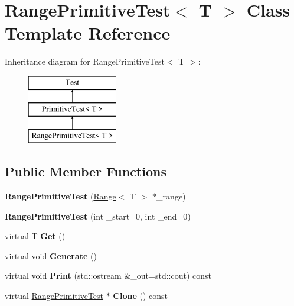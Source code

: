 \hypertarget{class_range_primitive_test}{}\section{Range\+Primitive\+Test$<$ T $>$ Class Template Reference}
\label{class_range_primitive_test}
Inheritance diagram for Range\+Primitive\+Test$<$ T $>$\+:\begin{figure}[H]
\begin{center}
\leavevmode
\includegraphics[height=3.000000cm]{class_range_primitive_test}
\end{center}
\end{figure}
\subsection*{Public Member Functions}
\begin{DoxyCompactItemize}
\item 
\mbox{\label{class_range_primitive_test_aa6661f7649f14fb09b1f2dd61e181f75}} 
{\bfseries Range\+Primitive\+Test} (\hyperlink{class_range}{Range}$<$ T $>$ $\ast$\+\_\+range)
\item 
\mbox{\label{class_range_primitive_test_a5d6683558e9057c056a5a8229b7fca5f}} 
{\bfseries Range\+Primitive\+Test} (int \+\_\+start=0, int \+\_\+end=0)
\item 
\mbox{\label{class_range_primitive_test_af0d7709c56a1a3e06e70572a09b3c921}} 
virtual T {\bfseries Get} ()
\item 
\mbox{\label{class_range_primitive_test_afcca64a473c09008aadbe42367ac71ba}} 
virtual void {\bfseries Generate} ()
\item 
\mbox{\label{class_range_primitive_test_a01ef34f0ffee1bb38f2ae4ce8754cb25}} 
virtual void {\bfseries Print} (std\+::ostream \&\+\_\+out=std\+::cout) const
\item 
\mbox{\label{class_range_primitive_test_a9539da245360c39d3da0a1ce8df56f6d}} 
virtual \hyperlink{class_range_primitive_test}{Range\+Primitive\+Test} $\ast$ {\bfseries Clone} () const
\end{DoxyCompactItemize}
